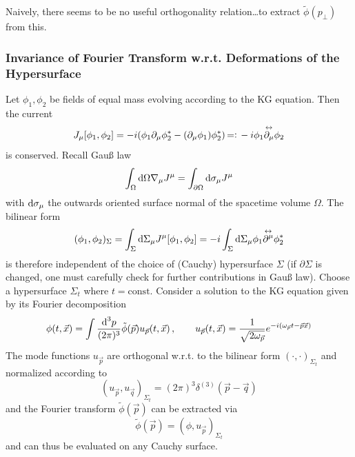 Naively, there seems to be no useful orthogonality relation\dots to extract $\tilde{\phi}(p_\perp)$ from this.

\subsubsection{Invariance of Fourier Transform w.r.t. Deformations of the Hypersurface}
\label{subsec:FourierDeformHypersurface}

Let $\phi_1,\phi_2$ be fields of equal mass evolving according to the KG equation. Then the current
\begin{equation}
    J_\mu[\phi_1,\phi_2]=-{i}(\phi_1\partial_\mu\phi_2^*-(\partial_\mu\phi_1)\phi_2^*){\,=\vcentcolon\,}-{i}\phi_1\overset{\leftrightarrow}{\partial_\mu}\phi_2
\end{equation}
is conserved. Recall Gauß law
\begin{equation}
    \int_\Omega\text{d} \Omega\nabla_\mu J^\mu=\int_{\partial\Omega}\text{d}\sigma_\mu J^\mu
\end{equation}
with $\text{d}\sigma_\mu$ the outwards oriented surface normal of the spacetime volume $\Omega$. The bilinear form
\begin{equation}
    (\phi_1,\phi_2)_\Sigma=\int_\Sigma\text{d}\Sigma_\mu J^\mu[\phi_1,\phi_2]=-{i}\int_\Sigma\text{d}\Sigma_\mu \phi_1\overset{\leftrightarrow}{\partial^\mu}\phi_2^*
\end{equation}
is therefore independent of the choice of (Cauchy) hypersurface $\Sigma$ (if $\partial\Sigma$ is changed, one must carefully check for further contributions in Gauß law). Choose a hypersurface $\Sigma_t$ where $t=\text{const}$. Consider a solution to the KG equation given by its Fourier decomposition
\begin{equation}
    \phi(t,\vec{x})=\int\frac{\text{d}^3p}{(2\pi)^3}\tilde{\phi}(\vec{p})u_{\vec{p}}(t,\vec{x})\,,\qquad u_{\vec{p}}(t,\vec{x})=\frac{1}{\sqrt{2\omega_{\vec{p}}}}e^{-{i}(\omega_{\vec{p}}t-\vec{p}\vec{x})}
\end{equation}
The mode functions $u_{\vec{p}}$ are orthogonal w.r.t. to the bilinear form $(\cdot,\cdot)_{\Sigma_t}$ and normalized according to
\begin{equation}
    (u_{\vec{p}},u_{\vec{q}})_{\Sigma_t}=(2\pi)^3\delta^{(3)}(\vec{p}-\vec{q})
\end{equation}
and the Fourier transform $\tilde{\phi}(\vec{p})$ can be extracted via $$\tilde{\phi}(\vec{p})=(\phi,u_{\vec{p}})_{\Sigma_t}$$ and can thus be evaluated on any Cauchy surface.


